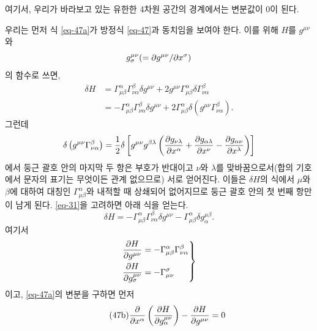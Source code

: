 여기서, 우리가 바라보고 있는 유한한 4차원 공간의 경계에서는 변분값이 0이 된다.

우리는 먼저 식 \eqref{eq-47a}가 방정식 \eqref{eq-47}과 동치임을 보여야 한다. 이를 위해 
$ H $를 $ g^{\mu\nu} $와 $$ g^{\mu\nu}_\sigma (= {{{\partial}{g^{\mu\nu}}}/{{\partial}{x^\sigma}}})$$의 함수로 쓰면, 
\begin{equation*}
	\begin{aligned}
		\delta H &= \Gamma_{\mu\beta}^{\alpha} \Gamma_{\nu\alpha}^{\beta}\delta g^{\mu\nu}
		+ 2 g^{\mu\nu} \Gamma_{\mu\beta}^{\alpha} \delta\Gamma_{\nu\alpha}^{\beta} \\
		&= -\Gamma_{\mu\beta}^{\alpha} \Gamma_{\nu\alpha}^{\beta}\delta g^{\mu\nu}
		+ 2\Gamma_{\mu\beta}^{\alpha} \delta \left( g^{\mu\nu} \Gamma_{\nu\alpha}^{\beta} \right).
	\end{aligned}
\end{equation*}
그런데
\begin{equation*}
	\delta \left( g^{\mu\nu} \Gamma_{\nu\alpha}^{\beta} \right)
	= \frac{1}{2}\delta\left[ g^{\mu\nu} g^{\beta\lambda} 
	\left(
	{\frac{{\partial}{g_{\nu\lambda}}}{{\partial}{x^\alpha}}}
	+ {\frac{{\partial}{g_{\alpha\lambda}}}{{\partial}{x^\nu}}}
	- {\frac{{\partial}{g_{\alpha\nu}}}{{\partial}{x^\lambda}}}
	\right)
	\right]
\end{equation*}
에서 둥근 괄호 안의 마지막 두 항은 부호가 반대이고 \Index{} $\nu$와 $\lambda$를 맞바꿈으로서(합의 기호에서 \Index{} 문자의 표기는 무엇이든 관계 없으므로) 서로 얻어진다. 이들은 $ \delta H $의 식에서 \Index{} $\mu$와 $\beta$에 대하여 대칭인 $\Gamma_{\mu\beta}^{\alpha}$와 내적할 때 상쇄되어 없어지므로 둥근 괄호 안의 첫 번째 항만이 남게 된다. \eqref{eq-31}을 고려하면 아래 식을 얻는다.
\begin{equation*}
	\delta H = -\Gamma_{\mu\beta}^{\alpha} \Gamma_{\nu\alpha}^{\beta} \delta g^{\mu\nu}
	-\Gamma_{\mu\beta}^{\alpha}\delta g_\alpha^{\mu\beta}.
\end{equation*}
여기서
\begin{equation} \label{eq-48}
	\left.
	\begin{aligned}
		&{\frac{{\partial}{H}}{{\partial}{g^{\mu\nu}}}}=-\Gamma_{\mu\beta}^\alpha \Gamma_{\nu\alpha}^\beta\\
		&{\frac{{\partial}{H}}{{\partial}{g_\sigma^{\mu\nu}}}}=-\Gamma_{\mu\nu}^\sigma
	\end{aligned} \right\}
\end{equation}
이고, \eqref{eq-47a}의 변분을 구하면 먼저
\begin{equation} \tag{47b} \label{eq-47b}
	{\frac{{\partial}{}}{{\partial}{x^\alpha}}}\left({\frac{{\partial}{H}}{{\partial}{g_\alpha^{\mu\nu}}}}\right)-{\frac{{\partial}{H}}{{\partial}{g^{\mu\nu}}}}=0
\end{equation}
